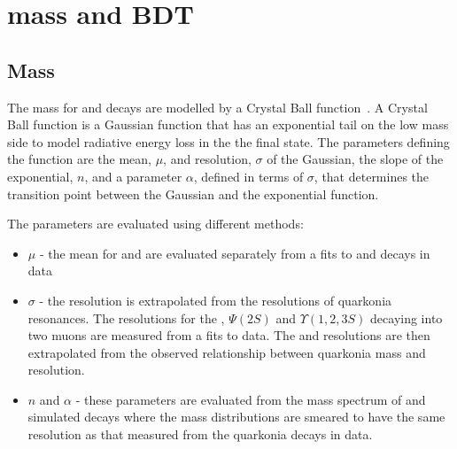 \section{\bsmumu mass and BDT \pdfs}
\label{sec:signalPdfs}

\subsection{Mass \pdfs}
The mass \pdfs for \bdmumu and \bsmumu decays are modelled by a Crystal Ball function~\cite{Skwarnicki:1986xj}. A Crystal Ball function is a Gaussian function that has an exponential tail on the low mass side to model radiative energy loss in the the final state. The parameters defining the function are the mean, $\mu$, and resolution, $\sigma$ of the Gaussian, the slope of the exponential, $n$, and a parameter $\alpha$, defined in terms of $\sigma$, that determines the transition point between the Gaussian and the exponential function. 

The parameters are evaluated using different methods:
\begin{itemize}
\item $\mu$ - the mean for \bd and \bs are evaluated separately from a fits to \bdkpi and \bskk decays in data
\item $\sigma$ - the resolution is extrapolated from the resolutions of quarkonia resonances. The resolutions for the \jpsi, $\Psi (2S)$ and $\Upsilon(1, 2, 3S)$ decaying into two muons are measured from a fits to data. The \bd and \bs resolutions are then extrapolated from the observed relationship between quarkonia mass and resolution.
\item $n$ and $\alpha$ - these parameters are evaluated from the mass spectrum of \bdmumu and \bsmumu simulated decays where the mass distributions are smeared to have the same resolution as that measured from the quarkonia decays in data.
\end{itemize}

